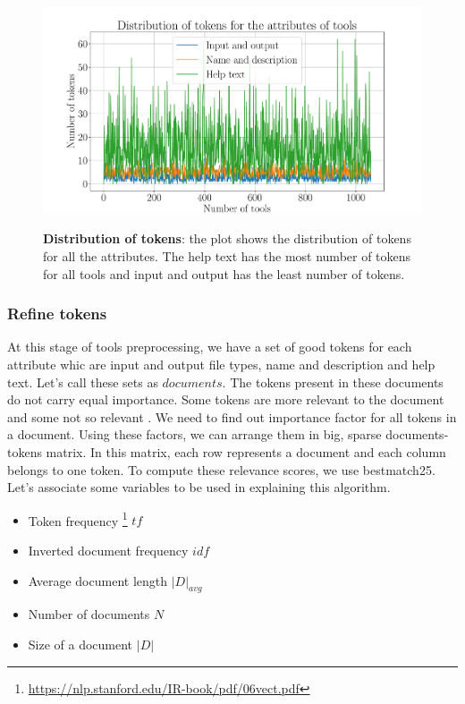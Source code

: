 \begin{figure}[h]
\begin{centering}
    {\includegraphics[scale=0.4]{figures/Tokens_dist.pdf}}
    \caption[Tokens distribution]{\textbf{Distribution of tokens}: the plot shows the distribution of tokens for all the attributes. The help text has the most number of tokens for all tools and input and output has the least number of tokens.}
\end{centering}
\end{figure}

\subsubsection{Refine tokens}
    At this stage of tools preprocessing, we have a set of good tokens for each attribute whic are input and output file types, name and description and help text. Let's call these sets as $documents$. The tokens present in these documents do not carry equal importance. Some tokens are more relevant to the document and some not so relevant . We need to find out importance factor for all tokens in a document. Using these factors, we can arrange them in big, sparse documents-tokens matrix. In this matrix, each row represents a document and each column belongs to one token. To compute these relevance scores, we use bestmatch25. Let's associate some variables to be used in explaining this algorithm.
    \begin{itemize}
	\item Token frequency \footnote{\url{https://nlp.stanford.edu/IR-book/pdf/06vect.pdf}} $tf$
	\item Inverted document frequency $idf$
	\item Average document length $|D|_{avg}$
	\item Number of documents $N$
	\item Size of a document $|D|$
\end{itemize}
    
